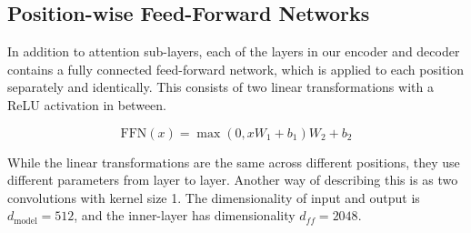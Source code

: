 \documentclass{article}
\newcommand{\kq}{q}
\newcommand{\km}{k}
\newcommand{\vq}{o}
\newcommand{\vm}{m}
\newcommand{\Wkq}{W_q}
\newcommand{\Wkm}{W_k}
\newcommand{\Wvq}{W_o}
\newcommand{\Wvm}{W_m}
\newcommand{\dmodel}{d_{\text{model}}}
\begin{document}
\subsection{Position-wise Feed-Forward Networks}\label{sec:ffn}

In addition to attention sub-layers, each of the layers in our encoder and decoder contains a fully connected feed-forward network, which is applied to each position separately and identically.  This consists of two linear transformations with a ReLU activation in between.

\begin{equation}
   \mathrm{FFN}(x)=\max(0, xW_1 + b_1) W_2 + b_2
\end{equation}

While the linear transformations are the same across different positions, they use different parameters from layer to layer. Another way of describing this is as two convolutions with kernel size 1.  The dimensionality of input and output is $\dmodel=512$, and the inner-layer has dimensionality $d_{ff}=2048$.






\end{document}
